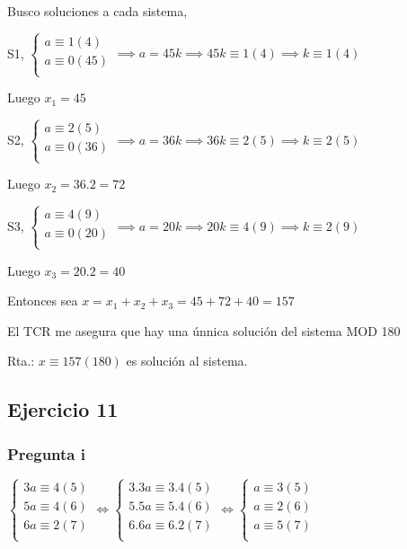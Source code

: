 Busco soluciones a cada sistema,

S1, $ \begin{cases}
    a\equiv 1(4) \\
    a\equiv 0(45) \\
\end{cases} \implies a = 45k \implies 45k \equiv 1(4) \implies k \equiv 1(4) $

Luego $ x_1 = 45 $

S2, $ \begin{cases}
    a\equiv 2(5) \\
    a\equiv 0(36) \\
\end{cases} \implies a = 36k \implies 36k \equiv 2(5) \implies k \equiv 2(5) $

Luego $ x_2 = 36.2 = 72 $

S3, $ \begin{cases}
    a\equiv 4(9) \\
    a\equiv 0(20) \\
\end{cases} \implies a = 20k \implies 20k \equiv 4(9) \implies k \equiv 2(9) $

Luego $ x_3 = 20.2 = 40 $

Entonces sea $ x = x_1 + x_2 + x_3 = 45+72+40 = 157 $

El TCR me asegura que hay una únnica solución del sistema MOD 180

Rta.: $ x \equiv 157 (180) $ es solución al sistema.

\subsection{Ejercicio 11}

\subsubsection{Pregunta i}

$ \begin{cases}
    3a \equiv 4(5) \\
    5a \equiv 4(6) \\
    6a \equiv 2(7) \\
\end{cases} 
\iff \begin{cases}
    3.3a \equiv 3.4(5) \\
    5.5a \equiv 5.4(6) \\
    6.6a \equiv 6.2(7) \\
\end{cases}
\iff \begin{cases}
    a \equiv 3(5) \\
    a \equiv 2(6) \\
    a \equiv 5(7) \\
\end{cases} $

